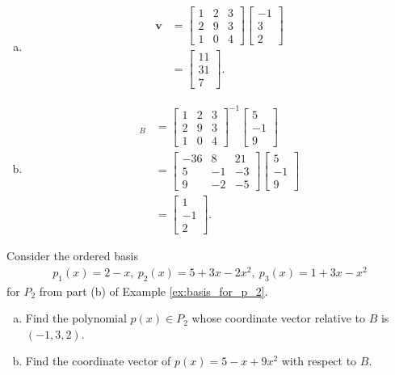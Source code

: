 \documentclass[12pt,letterpaper,reqno]{article}
\numberwithin{equation}{section}
\begin{document}
{\color{red}
\begin{solution}
	\begin{enumerate}[(a)]
		\item 
		\begin{align*}
			\mathbf{v}&=\begin{bmatrix}
				1 & 2 & 3 \\
				2 & 9 & 3 \\
				1 & 0 & 4
			\end{bmatrix}\begin{bmatrix}
				-1 \\ 3 \\2
			\end{bmatrix} \\
			&=\begin{bmatrix}
				11\\31 \\ 7
			\end{bmatrix}.
		\end{align*}
		\item 
		\begin{align*}
			[\mathbf{v}]_B&=\begin{bmatrix}
				1 & 2 & 3 \\
				2 & 9 & 3 \\
				1 & 0 & 4
			\end{bmatrix}^{-1}\begin{bmatrix}
				5 \\ -1 \\ 9
			\end{bmatrix} \\
			&=\begin{bmatrix}
				-36 & 8 & 21 \\
				5 & -1 & -3 \\
				9 & -2 & -5
			\end{bmatrix}\begin{bmatrix}
				5 \\ -1 \\9
			\end{bmatrix} \\
			&=\begin{bmatrix}
				1 \\ -1 \\ 2
			\end{bmatrix}.
		\end{align*}
	\end{enumerate}
\end{solution}}

\begin{exercise}
Consider the ordered basis
\begin{align*}
	p_1(x)=2-x, \ p_2(x)=5+3x-2x^2, \ p_3(x)=1+3x-x^2
\end{align*}	
for $P_2$ from part (b) of Example \ref{ex:basis_for_p_2}.
\begin{enumerate}[(a)]
	\item Find the polynomial $p(x) \in P_2$ whose coordinate vector relative to $B$ is $(-1,3,2)$.
	\item Find the coordinate vector of $p(x)=5-x+9x^2$ with respect to $B$.
\end{enumerate}
\end{exercise}
\end{document}
